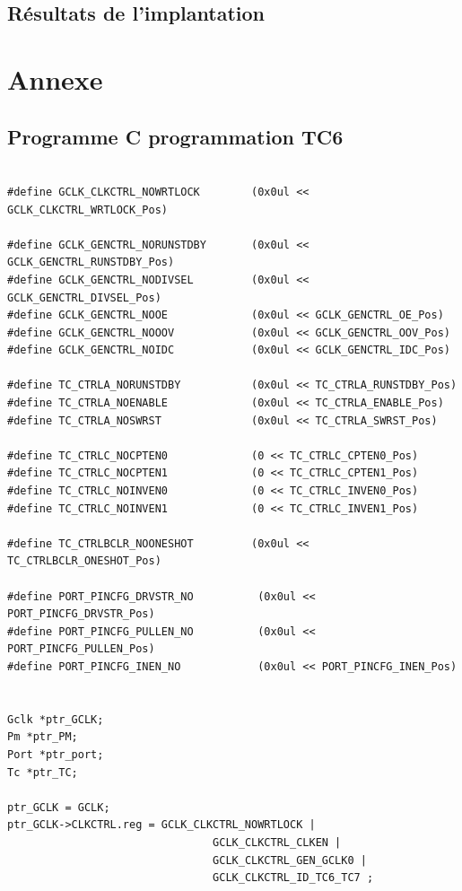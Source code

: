 \documentclass[a4paper]{article}
\begin{document}
\subsection{Résultats de l’implantation}
    
  
	{}
	
	
	\newpage
	
	\section{Annexe}
	
	\subsection{Programme C programmation TC6}
\begin{lstlisting}[style=CStyle]

#define GCLK_CLKCTRL_NOWRTLOCK        (0x0ul << GCLK_CLKCTRL_WRTLOCK_Pos)

#define GCLK_GENCTRL_NORUNSTDBY       (0x0ul << GCLK_GENCTRL_RUNSTDBY_Pos)
#define GCLK_GENCTRL_NODIVSEL         (0x0ul << GCLK_GENCTRL_DIVSEL_Pos)
#define GCLK_GENCTRL_NOOE             (0x0ul << GCLK_GENCTRL_OE_Pos)
#define GCLK_GENCTRL_NOOOV            (0x0ul << GCLK_GENCTRL_OOV_Pos)
#define GCLK_GENCTRL_NOIDC            (0x0ul << GCLK_GENCTRL_IDC_Pos)

#define TC_CTRLA_NORUNSTDBY           (0x0ul << TC_CTRLA_RUNSTDBY_Pos)
#define TC_CTRLA_NOENABLE             (0x0ul << TC_CTRLA_ENABLE_Pos)
#define TC_CTRLA_NOSWRST              (0x0ul << TC_CTRLA_SWRST_Pos)

#define TC_CTRLC_NOCPTEN0             (0 << TC_CTRLC_CPTEN0_Pos)
#define TC_CTRLC_NOCPTEN1             (0 << TC_CTRLC_CPTEN1_Pos)
#define TC_CTRLC_NOINVEN0             (0 << TC_CTRLC_INVEN0_Pos)
#define TC_CTRLC_NOINVEN1             (0 << TC_CTRLC_INVEN1_Pos)

#define TC_CTRLBCLR_NOONESHOT         (0x0ul << TC_CTRLBCLR_ONESHOT_Pos)

#define PORT_PINCFG_DRVSTR_NO          (0x0ul << PORT_PINCFG_DRVSTR_Pos)
#define PORT_PINCFG_PULLEN_NO          (0x0ul << PORT_PINCFG_PULLEN_Pos)
#define PORT_PINCFG_INEN_NO            (0x0ul << PORT_PINCFG_INEN_Pos)


Gclk *ptr_GCLK;
Pm *ptr_PM;
Port *ptr_port;
Tc *ptr_TC;

ptr_GCLK = GCLK;
ptr_GCLK->CLKCTRL.reg = GCLK_CLKCTRL_NOWRTLOCK |
								GCLK_CLKCTRL_CLKEN |
								GCLK_CLKCTRL_GEN_GCLK0 |
								GCLK_CLKCTRL_ID_TC6_TC7 ;


\end{lstlisting}
\end{document}

